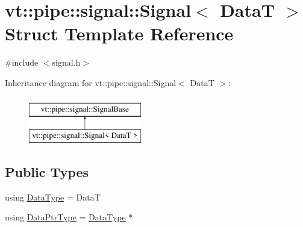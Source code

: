 \hypertarget{structvt_1_1pipe_1_1signal_1_1_signal}{}\section{vt\+:\+:pipe\+:\+:signal\+:\+:Signal$<$ DataT $>$ Struct Template Reference}
\label{structvt_1_1pipe_1_1signal_1_1_signal}


{\ttfamily \#include $<$signal.\+h$>$}

Inheritance diagram for vt\+:\+:pipe\+:\+:signal\+:\+:Signal$<$ DataT $>$\+:\begin{figure}[H]
\begin{center}
\leavevmode
\includegraphics[height=2.000000cm]{structvt_1_1pipe_1_1signal_1_1_signal}
\end{center}
\end{figure}
\subsection*{Public Types}
\begin{DoxyCompactItemize}
\item 
using \hyperlink{structvt_1_1pipe_1_1signal_1_1_signal_af5f782c77d6c762dc35fc097cce53732}{Data\+Type} = DataT
\item 
using \hyperlink{structvt_1_1pipe_1_1signal_1_1_signal_a9c8166338314e5d595575c21eaa42859}{Data\+Ptr\+Type} = \hyperlink{structvt_1_1pipe_1_1signal_1_1_signal_af5f782c77d6c762dc35fc097cce53732}{Data\+Type} $\ast$
\end{DoxyCompactItemize}
